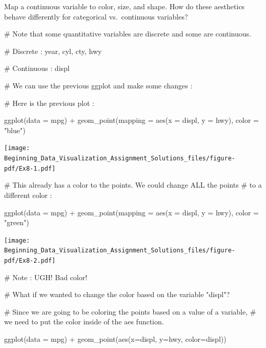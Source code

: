\documentclass[
  letterpaper,
  DIV=11,
  numbers=noendperiod]{scrreprt}
\newenvironment{Shaded}{\begin{snugshade}}{\end{snugshade}}
\newcommand{\AttributeTok}[1]{\textcolor[rgb]{0.40,0.45,0.13}{#1}}
\newcommand{\CommentTok}[1]{\textcolor[rgb]{0.37,0.37,0.37}{#1}}
\newcommand{\FunctionTok}[1]{\textcolor[rgb]{0.28,0.35,0.67}{#1}}
\newcommand{\NormalTok}[1]{\textcolor[rgb]{0.00,0.23,0.31}{#1}}
\newcommand{\SpecialCharTok}[1]{\textcolor[rgb]{0.37,0.37,0.37}{#1}}
\newcommand{\StringTok}[1]{\textcolor[rgb]{0.13,0.47,0.30}{#1}}
\begin{document}

Map a continuous variable to color, size, and shape. How do these
aesthetics behave differently for categorical vs.~continuous variables?

\begin{Shaded}
\begin{Highlighting}[]
\CommentTok{\# Note that some quantitative variables are discrete and some are continuous.}

\CommentTok{\# Discrete : year, cyl, cty, hwy}

\CommentTok{\# Continuous : displ}

\CommentTok{\# We can use the previous ggplot and make some changes :}

\CommentTok{\# Here is the previous plot : }

\FunctionTok{ggplot}\NormalTok{(}\AttributeTok{data =}\NormalTok{ mpg) }\SpecialCharTok{+} 
  \FunctionTok{geom\_point}\NormalTok{(}\AttributeTok{mapping =} \FunctionTok{aes}\NormalTok{(}\AttributeTok{x =}\NormalTok{ displ, }\AttributeTok{y =}\NormalTok{ hwy), }\AttributeTok{color =} \StringTok{"blue"}\NormalTok{)}
\end{Highlighting}
\end{Shaded}

\texttt{[image: Beginning\_Data\_Visualization\_Assignment\_Solutions\_files/figure-pdf/Ex8-1.pdf]}

\begin{Shaded}
\begin{Highlighting}[]
\CommentTok{\# This already has a color to the points. We could change ALL the points}
\CommentTok{\# to a different color :}

\FunctionTok{ggplot}\NormalTok{(}\AttributeTok{data =}\NormalTok{ mpg) }\SpecialCharTok{+} 
  \FunctionTok{geom\_point}\NormalTok{(}\AttributeTok{mapping =} \FunctionTok{aes}\NormalTok{(}\AttributeTok{x =}\NormalTok{ displ, }\AttributeTok{y =}\NormalTok{ hwy), }\AttributeTok{color =} \StringTok{"green"}\NormalTok{)}
\end{Highlighting}
\end{Shaded}

\texttt{[image: Beginning\_Data\_Visualization\_Assignment\_Solutions\_files/figure-pdf/Ex8-2.pdf]}

\begin{Shaded}
\begin{Highlighting}[]
\CommentTok{\# Note : UGH! Bad color!}

\CommentTok{\# What if we wanted to change the color based on the variable "displ"? }

\CommentTok{\# Since we are going to be coloring the points based on a value of a variable,}
\CommentTok{\# we need to put the color inside of the \textasciigrave{}aes\textasciigrave{} function.}

\FunctionTok{ggplot}\NormalTok{(}\AttributeTok{data =}\NormalTok{ mpg) }\SpecialCharTok{+} 
  \FunctionTok{geom\_point}\NormalTok{(}\FunctionTok{aes}\NormalTok{(}\AttributeTok{x=}\NormalTok{displ, }\AttributeTok{y=}\NormalTok{hwy, }\AttributeTok{color=}\NormalTok{displ))}
\end{Highlighting}
\end{Shaded}
\end{document}
